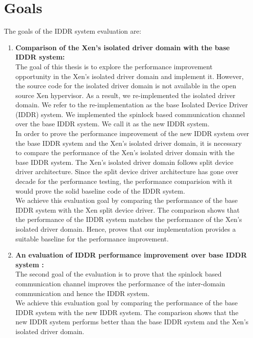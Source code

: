 \section{Goals}
\label{sec:goals}
The goals of the IDDR system evaluation are:
\begin{enumerate}
\item \textbf{Comparison of the Xen's isolated driver domain with the base IDDR system:}
\\[3mm]
The goal of this thesis is to explore the performance improvement opportunity in the Xen's isolated driver domain and implement it. However, the source code for the isolated driver domain is not available in the open source Xen hypervisor. As a result, we re-implemented the isolated driver domain. We refer to the re-implementation as the base Isolated Device Driver (IDDR) system. We implemented the spinlock based communication channel over the base IDDR system. We call it as the new IDDR system.
\\[3mm]
In order to prove the performance improvement of the new IDDR system over the base IDDR system and the Xen's isolated driver domain, it is necessary to compare the performance of the Xen's isolated driver domain with the base IDDR system. The Xen's isolated driver domain follows split device driver architecture. Since the split device driver architecture has gone over decade for the performance testing, the performance comparision with it would prove the solid baseline code of the IDDR system. 
\\[3mm]
We achieve this evaluation goal by comparing the performance of the base IDDR system with the Xen split device driver. The comparison shows that the performance of the IDDR system matches the performance of the Xen's isolated driver domain. Hence, proves that our implementation provides a suitable baseline for the performance improvement.

\item \textbf{An evaluation of IDDR performance improvement over base IDDR system :}
\\[3mm] 
The second goal of the evaluation is to prove that the spinlock based communication channel improves the performance of the inter-domain communication and hence the IDDR system.
\\[3mm]
We achieve this evaluation goal by comparing the performance of the base IDDR system with the new IDDR system. The comparison shows that the new IDDR system performs better than the base IDDR system and the Xen's isolated driver domain.
\end{enumerate}

